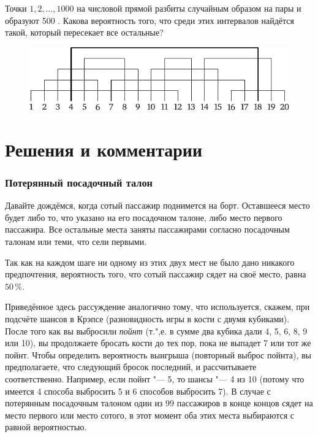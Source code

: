 \documentclass[twoside]{book}
\begin{document}
Точки $1, 2,\dots, 1000$ на числовой прямой разбиты случайным образом на пары и образуют 500 .
Какова вероятность того, что среди этих интервалов найдётся такой, который пересекает все остальные?

\begin{figure}[!ht]
\centering
\includegraphics{mp/wink-4}
\end{figure}


\section*{Решения и комментарии}

\subsubsection*{Потерянный посадочный талон}%

Давайте дождёмся, когда сотый пассажир поднимется на борт. 
Оставшееся место будет либо то, что указано на его посадочном талоне, либо место первого пассажира.
Все остальные места заняты пассажирами согласно посадочным талонам или теми, что сели первыми.

Так как на каждом шаге ни одному из этих двух мест не было дано никакого предпочтения, вероятность того, что сотый пассажир сядет на своё место, равна $50\,\%$.
\heart

Приведённое здесь рассуждение аналогично тому, что используется, скажем, при подсчёте шансов в Крэпсе (разновидность игры в кости с двумя кубиками).
После того как вы выбросили \emph{пойнт}
(т.",е. в сумме два кубика дали 4, 5, 6, 8, 9 или 10), вы продолжаете бросать кости до тех пор, пока не выпадет 7 или тот же пойнт.
Чтобы определить вероятность выигрыша (повторный выброс пойнта), вы предполагаете, что следующий бросок последний, и рассчитываете соответственно.
Например, если пойнт "--- 5, то шансы "--- 4 из 10 (потому что имеется 4 способа выбросить 5 и 6 способов выбросить 7).
В случае с потерянным посадочным талоном один из 99 пассажиров в конце концов сядет на место первого или место сотого, в этот момент оба этих места выбираются с равной вероятностью. 
\end{document}
